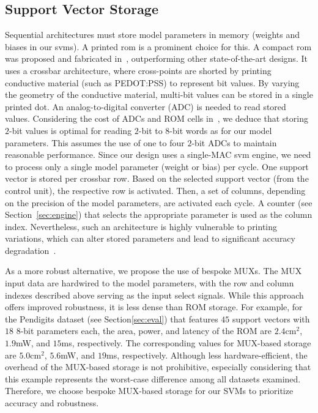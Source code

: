 \subsection{Support Vector Storage}\label{sec:memory}
Sequential architectures must store model parameters in memory (weights and biases in our \glspl{svm}).
A printed \gls{rom} is a prominent choice for this.
A compact \gls{rom} was proposed and fabricated in~\cite{Bleier:ISCA:2020:printedml}, outperforming other state-of-the-art designs.
It uses a crossbar architecture, where cross-points are shorted by printing conductive material (such as PEDOT:PSS) to represent bit values.
By varying the geometry of the conductive material, multi-bit values can be stored in a single printed dot.
An analog-to-digital converter (ADC) is needed to read stored values.
Considering the cost of ADCs and ROM cells in~\cite{Bleier:ISCA:2020:printedml}, we deduce that storing \mbox{$2$-bit} values is optimal for reading $2$-bit to $8$-bit words as for our model parameters.
This assumes the use of one to four \mbox{$2$-bit} ADCs to maintain reasonable performance.
Since our design uses a single-MAC \gls{svm} engine, we need to process only a single model parameter (weight or bias) per cycle.
One support vector is stored per crossbar row.
Based on the selected support vector (from the control unit), the respective row is activated. 
Then, a set of columns, depending on the precision of the model parameters, are activated each cycle.
A counter (see Section~\ref{sec:engine}) that selects the appropriate parameter is used as the column index.
Nevertheless, such an architecture is highly vulnerable to printing variations, which can alter stored parameters and lead to significant accuracy degradation~\cite{Zhao:DATE2023}. 

As a more robust alternative, we propose the use of bespoke MUXs.
The MUX input data are hardwired to the model parameters, with the row and column indexes described above serving as the input select signals.
While this approach offers improved robustness, it is less dense than ROM storage.
For example, for the Pendigits dataset (see Section\ref{sec:eval}) that features $45$ support vectors with $18$ $8$-bit parameters each, the area, power, and latency of the ROM are $2.4$cm$^2$, $1.9$mW, and $15$ms, respectively.
The corresponding values for MUX-based storage are $5.0$cm$^2$, $5.6$mW, and $19$ms, respectively.
Although less hardware-efficient, the overhead of the MUX-based storage is not prohibitive, especially considering that this example represents the worst-case difference among all datasets examined.
Therefore, we choose bespoke MUX-based storage for our SVMs to prioritize accuracy and robustness.




